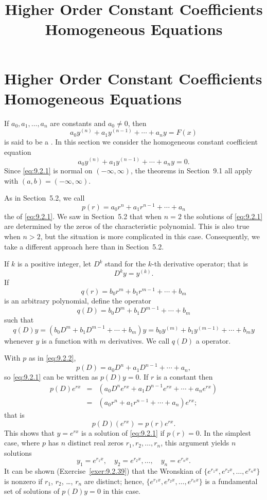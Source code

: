 \documentclass{ximera}
\title{Higher Order Constant Coefficients Homogeneous Equations}%
\begin{document}
\begin{abstract}

\end{abstract}

\maketitle

\section*{Higher Order Constant Coefficients Homogeneous Equations}

If $a_0, a_1, \dots, a_n$ are constants and $a_0\neq 0$, then
$$
a_0y^{(n)}+a_1y^{(n-1)}+\cdots+a_ny=F(x)
$$
is said to be a .
In this section we consider the homogeneous constant coefficient
equation
\begin{equation} \label{eq:9.2.1}
a_0y^{(n)}+a_1y^{(n-1)}+\cdots+a_ny=0.
\end{equation}
Since \eqref{eq:9.2.1} is normal on $(-\infty,\infty)$, the theorems in
Section~9.1 all apply with $(a,b)=(-\infty,\infty)$.

As in Section~5.2, we call
\begin{equation} \label{eq:9.2.2}
p(r)=a_0r^n+a_1r^{n-1}+\cdots+a_n
\end{equation}
the  of \eqref{eq:9.2.1}. We saw in
Section~5.2 that when $n=2$ the solutions of \eqref{eq:9.2.1} are
determined by the zeros of the characteristic polynomial. This is also
true when $n>2$, but the situation is more complicated in this case.
Consequently, we take a different approach here than in
Section~5.2.

If $k$ is a positive integer, let $D^k$ stand
for the $k$-th derivative operator;   that is
$$
D^ky=y^{(k)}.
$$
If
$$
q(r)=b_0r^m+b_1r^{m-1}+\cdots+b_m
$$
is an arbitrary polynomial,  define the operator
$$
q(D)=b_0D^m+b_1D^{m-1}+\cdots+b_m
$$
such that
$$
q(D)y=(b_0D^m+b_1D^{m-1}+\cdots+b_m)y=b_0y^{(m)}+b_1y^{(m-1)}+\cdots+
b_my
$$
whenever $y$ is a function with $m$ derivatives. We call $q(D)$
a   operator.

With $p$ as in \eqref{eq:9.2.2},
$$
p(D)=a_0D^n+a_1D^{n-1}+\cdots+a_n,
$$
so \eqref{eq:9.2.1} can be written as $p(D)y=0$.  If $r$ is a constant
then
\begin{eqnarray*}
p(D)e^{rx}&=&\left(a_0D^ne^{rx}+a_1D^{n-1}e^{rx}+\cdots+a_ne^{rx}\right)\\
&=&(a_0r^n+a_1r^{n-1}+\cdots+a_n)e^{rx};
\end{eqnarray*}
that is
$$
p(D)(e^{rx})=p(r)e^{rx}.
$$
This shows that $y=e^{rx}$ is a solution of \eqref{eq:9.2.1}
if $p(r)=0$.
In the simplest case, where $p$ has $n$ distinct real zeros
$r_1, r_2,\dots, r_n$, this argument yields $n$ solutions
$$
y_1=e^{r_1x},\quad y_2=e^{r_2x},\dots,\quad y_n=e^{r_nx}.
$$
It can be shown (Exercise~\ref{exer:9.2.39}) that the Wronskian of
$\{e^{r_1x},e^{r_2x},\dots,e^{r_nx}\}$ is nonzero if
$r_1$, $r_2$, \dots, $r_n$ are distinct; hence,
$\{e^{r_1x},e^{r_2x},\dots,e^{r_nx}\}$
is a fundamental set of solutions of $p(D)y=0$ in this case.
\end{document}
